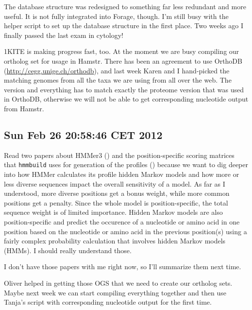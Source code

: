 The database structure was redesigned to something far less redundant and more
useful. It is not fully integrated into Forage, though. I'm still busy with the
helper script to set up the database structure in the first place. Two weeks ago
I finally passed the last exam in cytology! 

1KITE is making progress fast, too. At the moment we are busy compiling our
ortholog set for usage in Hamstr. There has been an agreement to use OrthoDB
(\url{http://cegg.unige.ch/orthodb}), and last week Karen and I hand-picked the
matching genomes from all the taxa we are using from all over the web. The
version and everything has to match exactly the proteome version that was used
in OrthoDB, otherwise we will not be able to get corresponding nucleotide output
from Hamstr. 

\subsection*{Sun Feb 26 20:58:46 CET 2012}

Read two papers about HMMer3 (\cite{Eddy2009}) and the position-specific scoring
matrices that \lstinline{hmmbuild} uses for generation of the profiles
(\cite{Henikoff1994}) because we want to dig deeper into how HMMer calculates
its profile hidden Markov models and how more or less diverse sequences impact
the overall sensitivity of a model. As far as I understood, more diverse
positions get a bonus weight, while more common positions get a penalty. Since
the whole model is position-specific, the total sequence weight is of limited
importance. Hidden Markov models are also position-specific and predict the
occurence of a nucleotide or amino acid in one position based on the nucleotide
or amino acid in the previous position(s) using a fairly complex probability
calculation that involves hidden Markov models (HMMs). I should really
understand those.

I don't have those papers with me right now, so I'll summarize them next time.

Oliver helped in getting those OGS that we need to create our ortholog sets.
Maybe next week we can start compiling everything together and then use Tanja's
script with corresponding nucleotide output for the first time.
